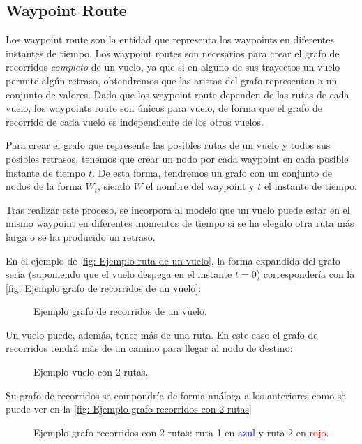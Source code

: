 \subsection*{Waypoint Route}
Los waypoint route son la entidad que representa los waypoints en diferentes instantes de tiempo. Los waypoint routes son necesarios para crear el grafo de recorridos \textit{completo} de un vuelo, ya que si en alguno de sus trayectos un vuelo permite algún retraso, obtendremos que las aristas del grafo representan a un conjunto de valores. Dado que los waypoint route dependen de las rutas de cada vuelo, los waypoints route son únicos para vuelo, de forma que el grafo de recorrido de cada vuelo es independiente de los otros vuelos.

Para crear el grafo que represente las posibles rutas de un vuelo y todos sus posibles retrasos, tenemos que crear un nodo por cada waypoint en cada posible instante de tiempo $t$. De esta forma, tendremos un grafo con un conjunto de nodos de la forma $W_{t}$, siendo $W$ el nombre del waypoint y $t$ el instante de tiempo.

Tras realizar este proceso, se incorpora al modelo que un vuelo puede estar en el mismo waypoint en diferentes momentos de tiempo si se ha elegido otra ruta más larga o se ha producido un retraso.

En el ejemplo de \autoref{fig: Ejemplo ruta de un vuelo}, la forma expandida del grafo sería (suponiendo que el vuelo despega en el instante $t=0$) correspondería con la \autoref{fig: Ejemplo grafo de recorridos de un vuelo}:
\begin{figure}[h]
	\centering
	\scalebox{.6}{}
	\caption{Ejemplo grafo de recorridos de un vuelo.}
	\label{fig: Ejemplo grafo de recorridos de un vuelo}
\end{figure}


Un vuelo puede, además, tener más de una ruta. En este caso el grafo de recorridos tendrá más de un camino para llegar al nodo de destino:
\begin{figure}[h]
	\centering
	
	\caption{Ejemplo vuelo con 2 rutas.}
	\label{fig: Ejemplo vuelo con 2 rutas}
\end{figure}

Su grafo de recorridos se compondría de forma análoga a los anteriores como se puede ver en la \autoref{fig: Ejemplo grafo recorridos con 2 rutas}
\begin{figure}[]
	\centering
		\scalebox{1}{}
	\caption{Ejemplo grafo recorridos con 2 rutas: ruta 1 en \textcolor{blue}{azul} y ruta 2 en \textcolor{red}{rojo}.  }
	\label{fig: Ejemplo grafo recorridos con 2 rutas}
\end{figure}



